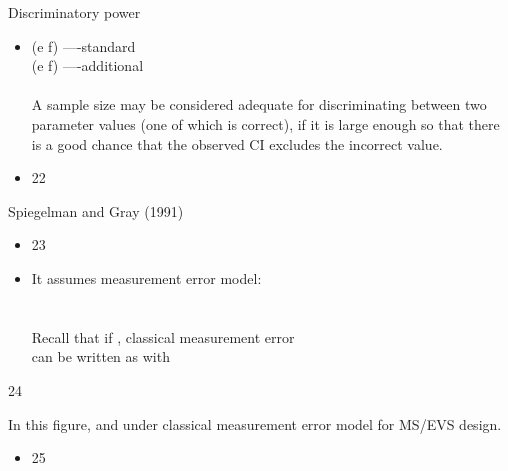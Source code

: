 \documentclass{beamer}
\begin{document}
\begin{frame}{Discriminatory power}
\begin{itemize}
\item (e                         f)  ----standard \\          (e                   f)                ----additional \\    \\ A sample size may be considered adequate for discriminating between two parameter values (one of which is correct), if it is large enough so that there is a good chance that the observed CI excludes the incorrect value.
\end{itemize}
\begin{itemize}
\item 22
\end{itemize}
\end{frame}
\begin{frame}{Spiegelman and Gray (1991)}
\begin{itemize}
\item 23
\end{itemize}
\begin{itemize}
\item It assumes measurement error model: \\  \\  \\ Recall that if                               , classical measurement error                                      \\     can be written as                                                 with
\end{itemize}
\end{frame}
\begin{frame}{24}
\end{frame}
\begin{frame}{In this figure,                                    and                         under classical measurement error model for MS/EVS design.}
\begin{itemize}
\item 25
\end{itemize}
\end{frame}
\end{document}
